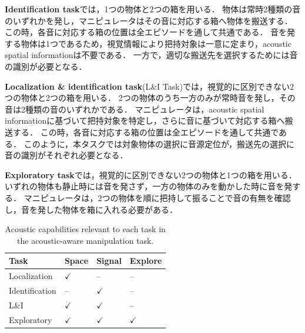 \documentclass{article}
\begin{document}
\textbf{Identification task}では，1つの物体と2つの箱を用いる．
物体は常時2種類の音のいずれかを発し，マニピュレータはその音に対応する箱へ物体を搬送する．
この時，各音に対応する箱の位置は全エピソードを通して共通である．
音を発する物体は1つであるため，視覚情報により把持対象は一意に定まり，acoustic spatial informationは不要である．
一方で，適切な搬送先を選択するためには音の識別が必要となる．

\textbf{Localization \& identification task}(L\&I Task)では，視覚的に区別できない2つの物体と2つの箱を用いる．
2つの物体のうち一方のみが常時音を発し，その音は2種類の音のいずれかである．
マニピュレータは，acoustic spatial informationに基づいて把持対象を特定し，さらに音に基づいて対応する箱へ搬送する．
この時，各音に対応する箱の位置は全エピソードを通して共通である．
このように，本タスクでは対象物体の選択に音源定位が，搬送先の選択に音の識別がそれぞれ必要となる．

\textbf{Exploratory task}では，視覚的に区別できない2つの物体と1つの箱を用いる．
いずれの物体も静止時には音を発さず，一方の物体のみを動かした時に音を発する．
マニピュレータは，2つの物体を順に把持して振ることで音の有無を確認し，音を発した物体を箱に入れる必要がある．


\begin{table}
  \centering
  \scriptsize
  \setlength{\tabcolsep}{3pt}
  \caption{
	Acoustic capabilities relevant to each task in the acoustic-aware manipulation task.
	}
  \label{tab:tasks}
  \begin{tabular}{p{} p{}
    >{\centering\arraybackslash}p{}
    >{\centering\arraybackslash}p{}}
    \hline
    Task & Space & Signal & Explore \\
    \hline
    Localization & $\checkmark$ & -- & -- \\
    Identification & -- & $\checkmark$ & -- \\
    L\&I & $\checkmark$ & $\checkmark$ & -- \\
    Exploratory & $\checkmark$ & $\checkmark$ & $\checkmark$ \\
    \hline
  \end{tabular}
\end{table}
\end{document}
